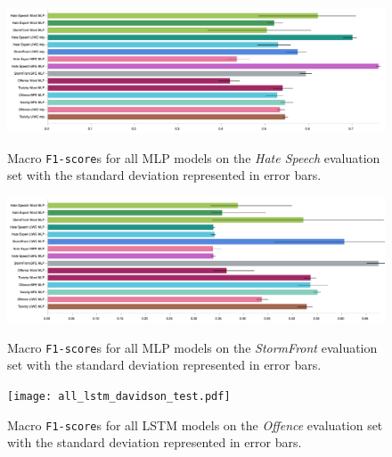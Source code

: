 \begin{figure}
\begin{minipage}{\textwidth}
\centering
  \includegraphics[width=\textwidth]{all_mlp_waseem_hovy_test.pdf}
  \caption{Macro \texttt{F1-score}s for all MLP models on the \textit{Hate Speech} evaluation set with the standard deviation represented in error bars.}
  \label{fig:waseem_hovy_mlp_test}
\vfill
  \includegraphics[width=\textwidth]{all_mlp_garcia_test.pdf}
  \caption{Macro \texttt{F1-score}s for all MLP models on the \textit{StormFront} evaluation set with the standard deviation represented in error bars.}
  \label{fig:garcia_mlp_test}
  \vfill
    \texttt{[image: all\_lstm\_davidson\_test.pdf]}
    \caption{Macro \texttt{F1-score}s for all LSTM models on the \textit{Offence} evaluation set with the standard deviation represented in error bars.}
    \label{fig:davidson_lstm_test}
  \end{minipage}
\end{figure}

